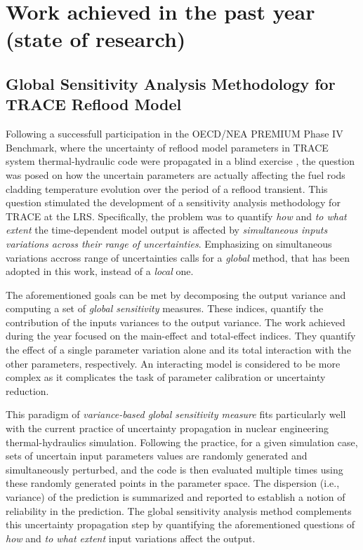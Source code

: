 \documentclass[11pt,titlepage]{article}
\begin{document}
\section{Work achieved in the past year (state of research)}

\subsection{Global Sensitivity Analysis Methodology for TRACE Reflood Model}

Following a successfull participation in the OECD/NEA PREMIUM Phase IV Benchmark, where the uncertainty of reflood model parameters in TRACE system thermal-hydraulic code were propagated in a blind exercise \cite{Wicaksono2014c}, the question was posed on how the uncertain parameters are actually affecting the fuel rods cladding temperature evolution over the period of a reflood transient.
This question stimulated the development of a sensitivity analysis methodology for TRACE at the LRS.
Specifically, the problem was to quantify \emph{how} and \emph{to what extent} the time-dependent model output is affected by \emph{simultaneous inputs variations across their range of uncertainties}.
Emphasizing on simultaneous variations accross range of uncertainties calls for a \emph{global} method, that has been adopted in this work, instead of a \emph{local} one.

The aforementioned goals can be met by decomposing the output variance and computing a set of \emph{global sensitivity} measures. 
These indices, quantify the contribution of the inputs variances to the output variance.
The work achieved during the year focused on the main-effect and total-effect indices.
They quantify the effect of a single parameter variation alone and its total interaction with the other parameters, respectively.
An interacting model is considered to be more complex as it complicates the task of parameter calibration or uncertainty reduction.

This paradigm of \textit{variance-based global sensitivity measure} fits particularly well with the current practice of uncertainty propagation in nuclear engineering thermal-hydraulics simulation.
Following the practice, for a given simulation case, sets of uncertain input parameters values are randomly generated and simultaneously perturbed, and the code is then evaluated multiple times using
these randomly generated points in the parameter space.
The dispersion (i.e., variance) of the prediction is summarized and reported to establish a notion of reliability in the prediction.
The global sensitivity analysis method complements this uncertainty propagation step by quantifying the 
aforementioned questions of \emph{how} and \emph{to what extent} input variations affect the output.
\end{document}
